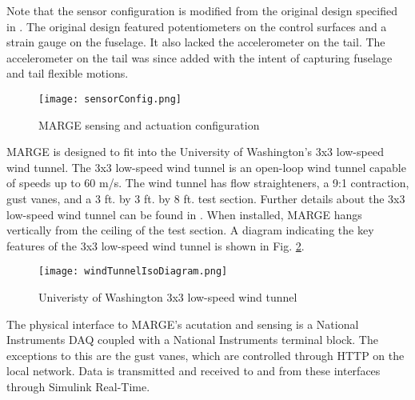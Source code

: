 Note that the sensor configuration is modified from the original design specified in \cite{Quenzer2019}. The original design featured potentiometers on the control surfaces and a strain gauge on the fuselage. It also lacked the accelerometer on the tail. The accelerometer on the tail was since added with the intent of capturing fuselage and tail flexible motions.
\begin{figure}[h]
    \centering
    \texttt{[image: sensorConfig.png]}
    \caption{MARGE sensing and actuation configuration}
    \label{fig:sensorConfig}
\end{figure}

MARGE is designed to fit into the University of Washington's 3x3 low-speed wind tunnel. The 3x3 low-speed wind tunnel is an open-loop wind tunnel capable of speeds up to 60 m/s. The wind tunnel has flow straighteners, a 9:1 contraction, gust vanes, and a 3 ft. by 3 ft. by 8 ft. test section. Further details about the 3x3 low-speed wind tunnel can be found in \cite{3x3site}. When installed, MARGE hangs vertically from the ceiling of the test section. A diagram indicating the key features of the 3x3 low-speed wind tunnel is shown in Fig. \ref{fig:3x3}.
\begin{figure}[h]
    \centering
    \texttt{[image: windTunnelIsoDiagram.png]}
    \caption{Univeristy of Washington 3x3 low-speed wind tunnel}
    \label{fig:3x3}
\end{figure}

The physical interface to MARGE's acutation and sensing is a National Instruments DAQ coupled with a National Instruments terminal block. The exceptions to this are the gust vanes, which are controlled through HTTP on the local network. Data is transmitted and received to and from these interfaces through Simulink Real-Time.